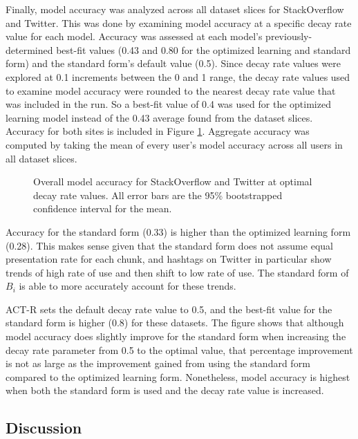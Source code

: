 \documentclass[man,floatsintext,donotrepeattitle]{apa6}
\newcommand{\numNoZero}[1]{{\sisetup{add-integer-zero=false}\num{#1}}}
\begin{document}
\FloatBarrier

Finally, model accuracy was analyzed across all dataset slices for StackOverflow and Twitter.
This was done by examining model accuracy at a specific decay rate value for each model.
Accuracy was assessed at each model's previously-determined best-fit values (\num{.43} and \num{.80} for the optimized learning and standard form) and the standard form's default value (\num{0.5}).
Since decay rate values were explored at \num{0.1} increments between the 0 and 1 range, the decay rate values used to examine model accuracy were rounded to the nearest decay rate value that was included in the run.
So a best-fit value of \num{.4} was used for the optimized learning model instead of the \num{.43} average found from the dataset slices.
Accuracy for both sites is included in Figure \ref{figPriorAcc}. 
Aggregate accuracy was computed by taking the mean of every user's model accuracy across all users in all dataset slices.

\begin{figure}[!htbp]
  \caption{
    Overall model accuracy for StackOverflow and Twitter at optimal decay rate values.
    All error bars are the 95\% bootstrapped confidence interval for the mean. 
  }
  \label{figPriorAcc}
\end{figure}

Accuracy for the standard form (\numNoZero{.33}) is higher than the optimized learning form (\numNoZero{.28}).
This makes sense given that the standard form does not assume equal presentation rate for each chunk, and hashtags on Twitter in particular show trends of high rate of use and then shift to low rate of use. 
The standard form of $B_{i}$ is able to more accurately account for these trends.

ACT-R sets the default decay rate value to \num{0.5}, and the best-fit value for the standard form is higher (\num{0.8}) for these datasets.
The figure shows that although model accuracy does slightly improve for the standard form when increasing the decay rate parameter from \num{0.5} to the optimal value,
that percentage improvement is not as large as the improvement gained from using the standard form compared to the optimized learning form.
Nonetheless, model accuracy is highest when both the standard form is used and the decay rate value is increased. 

\subsection{Discussion}
\end{document}
